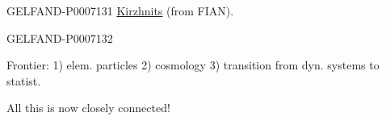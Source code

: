 \begin{GelfandAdjacentEvidence}{GELFAND-P000713}{1}
\underline{Kirzhnits}  (from FIAN).


\end{GelfandAdjacentEvidence}
\begin{GelfandAdjacentEvidence}{GELFAND-P000713}{2}

Frontier: 1) elem. particles 2) cosmology 3) transition from dyn. systems to statist.

All this is now closely connected!

\end{GelfandAdjacentEvidence}
